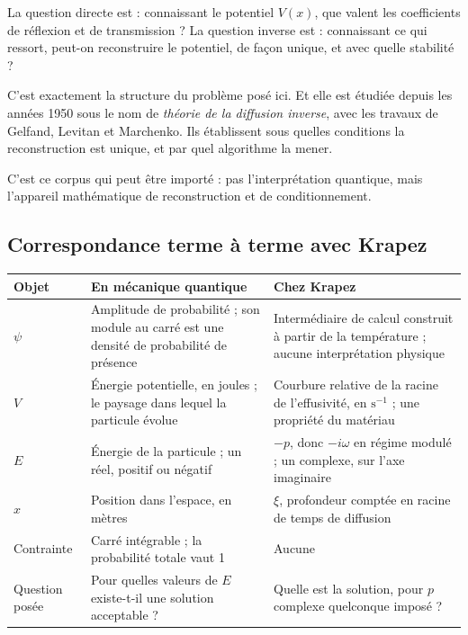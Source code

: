 \documentclass[11pt,a4paper]{article}
\begin{document}
La question directe est : connaissant le potentiel $V(x)$, que valent les coefficients de réflexion et
de transmission ? La question inverse est : connaissant ce qui ressort, peut-on reconstruire le
potentiel, de façon unique, et avec quelle stabilité ?

C'est exactement la structure du problème posé ici. Et elle est étudiée depuis les années 1950 sous le
nom de \emph{théorie de la diffusion inverse}, avec les travaux de Gelfand, Levitan et Marchenko. Ils
établissent sous quelles conditions la reconstruction est unique, et par quel algorithme la mener.

C'est ce corpus qui peut être importé : pas l'interprétation quantique, mais l'appareil mathématique de
reconstruction et de conditionnement.

\newpage
\subsection{Correspondance terme à terme avec Krapez}

\begin{center}
\begin{tabularx}{\textwidth}{@{}lXX@{}}
\toprule
\textbf{Objet} & \textbf{En mécanique quantique} & \textbf{Chez Krapez} \\
\midrule
$\psi$ & Amplitude de probabilité ; son module au carré est une densité de probabilité de présence
       & Intermédiaire de calcul construit à partir de la température ; aucune interprétation physique \\
\addlinespace
$V$ & Énergie potentielle, en joules ; le paysage dans lequel la particule évolue
    & Courbure relative de la racine de l'effusivité, en $\mathrm{s^{-1}}$ ; une propriété du matériau \\
\addlinespace
$E$ & Énergie de la particule ; un réel, positif ou négatif
    & $-p$, donc $-i\omega$ en régime modulé ; un complexe, sur l'axe imaginaire \\
\addlinespace
$x$ & Position dans l'espace, en mètres
    & $\xi$, profondeur comptée en racine de temps de diffusion \\
\addlinespace
Contrainte & Carré intégrable ; la probabilité totale vaut 1 & Aucune \\
\addlinespace
Question posée & Pour quelles valeurs de $E$ existe-t-il une solution acceptable ?
               & Quelle est la solution, pour $p$ complexe quelconque imposé ? \\
\bottomrule
\end{tabularx}
\end{center}
\end{document}
